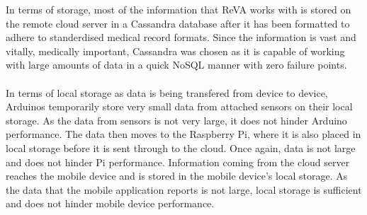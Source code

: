 In terms of storage, most of the information that ReVA works with is stored on the remote cloud server in a Cassandra database after it
has been formatted to adhere to standerdised medical record formats. Since the information is vast and vitally, medically important, Cassandra
was chosen as it is capable of working with large amounts of data in a quick NoSQL manner with zero failure points.\\ \\In terms of local storage
as data is being transfered from device to device, Arduinos temporarily store very small data from attached sensors on their local storage. As
the data from sensors is not very large, it does not hinder Arduino performance. The data then moves to the Raspberry Pi, where it is also placed 
in local storage before it is sent through to the cloud. Once again, data is not large and does not hinder Pi performance. Information coming from the 
cloud server reaches the mobile device and is stored in the mobile device's local storage. As the data that the mobile application reports is not 
large, local storage is sufficient and does not hinder mobile device performance. 

